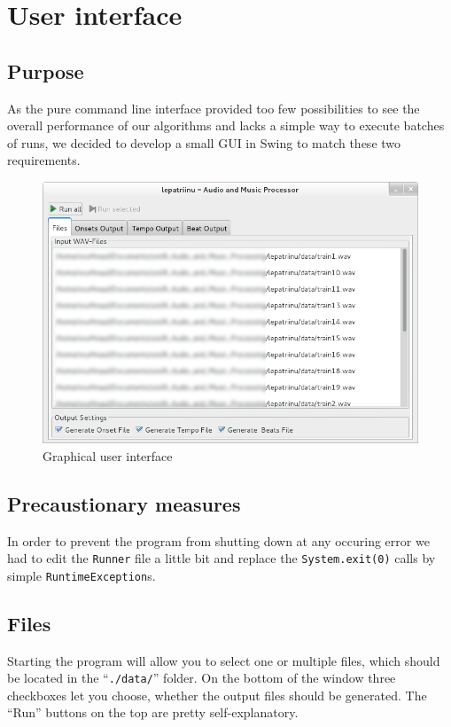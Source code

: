 \chapter{User interface} \label{cpt:gui}

\section{Purpose}
As the pure command line interface provided too few possibilities to see the
overall performance of our algorithms and lacks a simple way to execute
batches of runs, we decided to develop a small GUI in Swing to match these two
requirements.

\begin{figure}[htp]
\begin{center}
  \includegraphics[width=\textwidth]{chapter/gui}
  \caption{Graphical user interface}
  \label{fig:gui}
\end{center}
\end{figure}

\section{Precaustionary measures}
In order to prevent the program from shutting down at any occuring error we had
to edit the \texttt{Runner} file a little bit and replace the
\texttt{System.exit(0)} calls by simple \texttt{RuntimeException}s.

\section{Files}
Starting the program will allow you to select one or multiple files, which
should be located in the ``\texttt{./data/}'' folder. On the bottom of the
window three checkboxes let you choose, whether the output files should be
generated. The ``Run'' buttons on the top are pretty self-explanatory.

